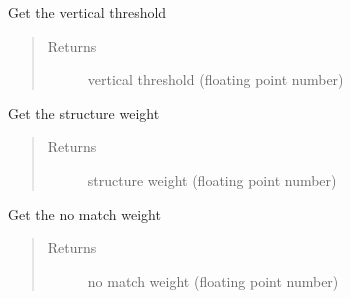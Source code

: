 \documentclass[letterpaper,10pt,english]{sphinxmanual}
\begin{document}
\begin{fulllineitems}
\begin{fulllineitems}
\label{\detokenize{customParameters:objects.customParameters.customParameters.getVerticalThreshold}}
Get the vertical threshold
\begin{quote}\begin{description}
\item[{Returns}] \leavevmode
vertical threshold (floating point number)

\end{description}\end{quote}

\end{fulllineitems}


\begin{fulllineitems}
\label{\detokenize{customParameters:objects.customParameters.customParameters.getStructureWeight}}
Get the structure weight
\begin{quote}\begin{description}
\item[{Returns}] \leavevmode
structure weight (floating point number)

\end{description}\end{quote}

\end{fulllineitems}


\begin{fulllineitems}
\label{\detokenize{customParameters:objects.customParameters.customParameters.getNoMatchWeight}}
Get the no match weight
\begin{quote}\begin{description}
\item[{Returns}] \leavevmode
no match weight (floating point number)

\end{description}\end{quote}


\end{fulllineitems}
\end{fulllineitems}
\end{document}
